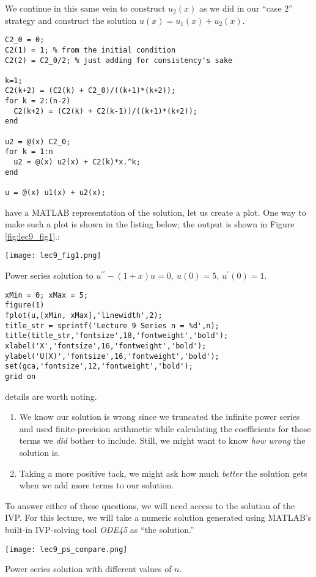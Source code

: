 We continue in this same vein to construct $u_2(x)$ as we did in our ``case 2'' strategy and construct the solution $u(x) = u_1(x) + u_2(x)$.
\begin{lstlisting}[name=lec9_ex1]
C2_0 = 0;
C2(1) = 1; % from the initial condition
C2(2) = C2_0/2; % just adding for consistency's sake

k=1;
C2(k+2) = (C2(k) + C2_0)/((k+1)*(k+2));
for k = 2:(n-2)
  C2(k+2) = (C2(k) + C2(k-1))/((k+1)*(k+2));
end

u2 = @(x) C2_0;
for k = 1:n
  u2 = @(x) u2(x) + C2(k)*x.^k;
end

u = @(x) u1(x) + u2(x);
\end{lstlisting}

 have a MATLAB representation of the solution, let us create a plot.  One way to make such a plot is shown in the listing below; the output is shown in Figure \ref{fig:lec9_fig1}.:
\begin{marginfigure}
\texttt{[image: lec9\_fig1.png]}
\caption{Power series solution to $u^{\prime \prime}-(1+x)u=0, \ u(0)=5,\ u^{\prime}(0)=1$.}
\label{fig:lec9_fig1}
\end{marginfigure}
\begin{lstlisting}[name=lec9_ex1]
xMin = 0; xMax = 5;
figure(1)
fplot(u,[xMin, xMax],'linewidth',2);
title_str = sprintf('Lecture 9 Series n = %d',n);
title(title_str,'fontsize',18,'fontweight','bold');
xlabel('X','fontsize',16,'fontweight','bold');
ylabel('U(X)','fontsize',16,'fontweight','bold');
set(gca,'fontsize',12,'fontweight','bold');
grid on
\end{lstlisting}
 details are worth noting.  
\begin{enumerate}
\item We know our solution is wrong since we truncated the infinite power series and used finite-precision arithmetic while calculating the coefficients for those terms we \emph{did} bother to include.  Still, we might want to know \emph{how wrong} the solution is.
\item Taking a more positive tack, we might ask how much \emph{better} the solution gets when we add more terms to our solution.
\end{enumerate}
To answer either of these questions, we will need access to the solution of the IVP.  For this lecture, we will take a numeric solution generated using MATLAB's built-in IVP-solving tool \emph{ODE45} as ``the solution.''
\begin{marginfigure}
\texttt{[image: lec9\_ps\_compare.png]}
\caption{Power series solution with different values of $n$.}
\label{fig:lec9_ps_compare}
\end{marginfigure}

